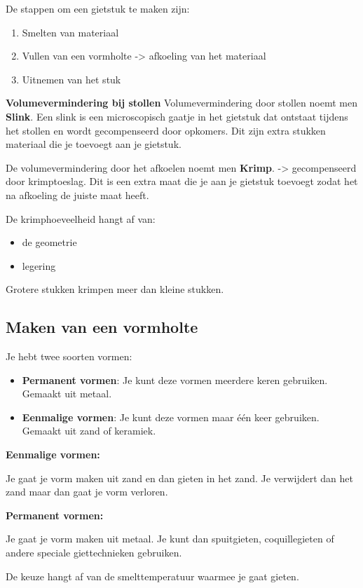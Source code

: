 \documentclass[a4paper,12pt,twoside]{report}
\begin{document}
De stappen om een gietstuk te maken zijn:
\begin{enumerate}
	\item Smelten van materiaal
	\item Vullen van een vormholte -> afkoeling van het materiaal
	\item Uitnemen van het stuk
\end{enumerate}

\begin{conceptbox}
	\textbf{Volumevermindering bij stollen}
	Volumevermindering door stollen noemt men \textbf{Slink}. Een slink is een microscopisch gaatje in het gietstuk dat ontstaat tijdens het stollen en wordt gecompenseerd door opkomers.
	Dit zijn extra stukken materiaal die je toevoegt aan je gietstuk.

	De volumevermindering door het afkoelen noemt men \textbf{Krimp}. -> gecompenseerd door krimptoeslag.
	Dit is een extra maat die je aan je gietstuk toevoegt zodat het na afkoeling de juiste maat heeft.

	De krimphoeveelheid hangt af van:
	\begin{itemize}
		\item de geometrie
		\item legering
	\end{itemize}
	Grotere stukken krimpen meer dan kleine stukken.
\end{conceptbox}

\subsection{Maken van een vormholte}
Je hebt twee soorten vormen:
\begin{itemize}
	\item \textbf{Permanent vormen}: Je kunt deze vormen meerdere keren gebruiken. Gemaakt uit metaal.
	\item \textbf{Eenmalige vormen}: Je kunt deze vormen maar één keer gebruiken. Gemaakt uit zand of keramiek.
\end{itemize}
\textbf{Eenmalige vormen:}

Je gaat je vorm maken uit zand en dan gieten in het zand. 
Je verwijdert dan het zand maar dan gaat je vorm verloren.

\textbf{Permanent vormen:}

Je gaat je vorm maken uit metaal.
Je kunt dan spuitgieten, coquillegieten of andere speciale giettechnieken gebruiken.

De keuze hangt af van de smelttemperatuur waarmee je gaat gieten.
\end{document}
